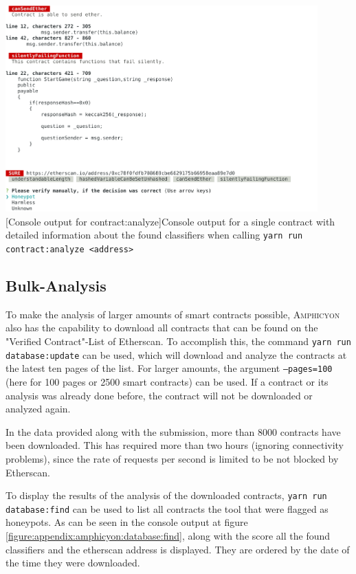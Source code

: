 \vspace{1em}
\begin{minipage}{\linewidth}
	\centering
	\includegraphics[width=12cm]{img/amphicyon/contract_analyze.pdf}
	[Console output for contract:analyze]{Console output for a single contract with detailed information about the found classifiers when calling \texttt{yarn run contract:analyze <address>}}
	\label{figure:appendix:amphicyon:contract:analyze}
\end{minipage}

\subsection{Bulk-Analysis}
To make the analysis of larger amounts of smart contracts possible, \textsc{Amphicyon} also has the capability to download all contracts that can be found on the "Verified Contract"-List of Etherscan. To accomplish this, the command \texttt{yarn run database:update} can be used, which will download and analyze the contracts at the latest ten pages of the list. For larger amounts, the argument \texttt{--pages=100} (here for 100 pages or 2500 smart contracts) can be used. If a contract or its analysis was already done before, the contract will not be downloaded or analyzed again.

In the data provided along with the submission, more than 8000 contracts have been downloaded. This has required more than two hours (ignoring connectivity problems), since the rate of requests per second is limited to be not blocked by Etherscan.

To display the results of the analysis of the downloaded contracts, \texttt{yarn run database:find} can be used to list all contracts the tool that were flagged as honeypots. As can be seen in the console output at figure \ref{figure:appendix:amphicyon:database:find}, along with the score all the found classifiers and the etherscan address is displayed. They are ordered by the date of the time they were downloaded.

